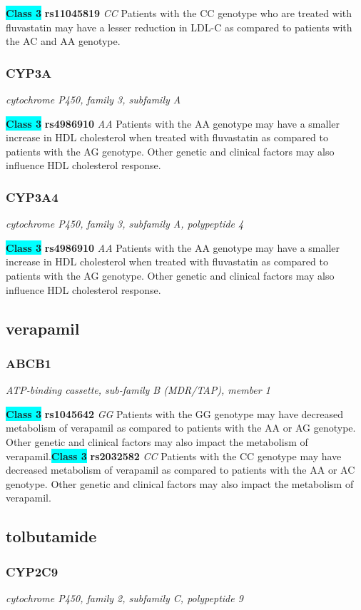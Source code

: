 \documentclass{report}
\begin{document}
\textbf{\colorbox{cyan} {Class 3}} \textbf{ rs11045819 } \textit{ CC }
Patients with the CC genotype who are treated with fluvastatin may have a lesser reduction in LDL-C as compared to patients with the AC and AA genotype.\newline\subsubsection{ CYP3A }
\textit{ cytochrome P450, family 3, subfamily A }

\textbf{\colorbox{cyan} {Class 3}} \textbf{ rs4986910 } \textit{ AA }
Patients with the AA genotype may have a smaller increase in HDL cholesterol when treated with fluvastatin as compared to patients with the AG genotype. Other genetic and clinical factors may also influence HDL cholesterol response.\newline\subsubsection{ CYP3A4 }
\textit{ cytochrome P450, family 3, subfamily A, polypeptide 4 }

\textbf{\colorbox{cyan} {Class 3}} \textbf{ rs4986910 } \textit{ AA }
Patients with the AA genotype may have a smaller increase in HDL cholesterol when treated with fluvastatin as compared to patients with the AG genotype. Other genetic and clinical factors may also influence HDL cholesterol response.\newline\subsection{ verapamil }\subsubsection{ ABCB1 }
\textit{ ATP-binding cassette, sub-family B (MDR/TAP), member 1 }

\textbf{\colorbox{cyan} {Class 3}} \textbf{ rs1045642 } \textit{ GG }
Patients with the GG genotype may have decreased metabolism of verapamil as compared to patients with the AA or AG genotype. Other genetic and clinical factors may also impact the metabolism of verapamil.\newline\textbf{\colorbox{cyan} {Class 3}} \textbf{ rs2032582 } \textit{ CC }
Patients with the CC genotype may have decreased metabolism of verapamil as compared to patients with the AA or AC genotype. Other genetic and clinical factors may also impact the metabolism of verapamil.\newline\subsection{ tolbutamide }\subsubsection{ CYP2C9 }
\textit{ cytochrome P450, family 2, subfamily C, polypeptide 9 }
\end{document}
